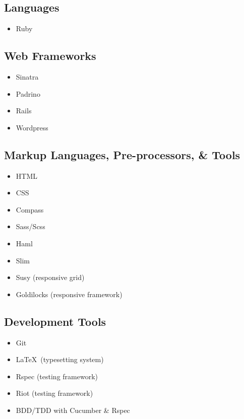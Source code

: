 \documentclass{article}
\begin{document}
\begin{multicols}{3}
\subsection{Languages} %
\label{sub:Languages}

\begin{itemize}
  \item Ruby
\end{itemize}

\subsection{Web Frameworks} %
\label{sub:Web Frameworks}

\begin{itemize}
  \item Sinatra
  \item Padrino
  \item Rails
  \item Wordpress
\end{itemize}

\subsection{Markup Languages, Pre-processors, \& Tools} %
\label{sub:Markup Languages, Pre-processors, \& Tools}

\begin{itemize}
  \item HTML
  \item CSS
  \item Compass
  \item Sass/Scss
  \item Haml
  \item Slim
  \item Susy (responsive grid)
  \item Goldilocks (responsive framework)
\end{itemize}

\subsection{Development Tools} %
\label{sub:Development Tools}

\begin{itemize}
  \item Git
  \item \LaTeX\ (typesetting system)
  \item Rspec (testing framework)
  \item Riot (testing framework)
  \item BDD/TDD with Cucumber \& Rspec
\end{itemize}

\end{multicols}
\end{document}
